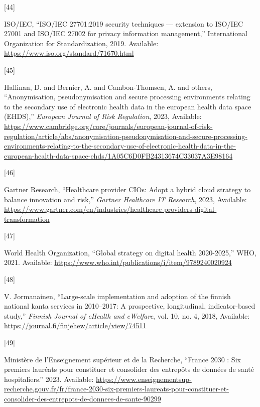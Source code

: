 \documentclass[
  a4paper,
  a4paper,
  11pt]{ltjsbook}
\newlength{\cslhangindent}
\newlength{\csllabelwidth}
\newenvironment{CSLReferences}[2] %
 {\begin{list}{}{%
  \setlength{\itemindent}{0pt}
  \setlength{\leftmargin}{0pt}
  \setlength{\parsep}{0pt}
  \ifodd #1
   \setlength{\leftmargin}{\cslhangindent}
   \setlength{\itemindent}{-1\cslhangindent}
  \fi
  \setlength{\itemsep}{#2\baselineskip}}}
 {\end{list}}
\newcommand{\CSLLeftMargin}[1]{\parbox[t]{\csllabelwidth}{\strut#1\strut}}
\newcommand{\CSLRightInline}[1]{\parbox[t]{\linewidth - \csllabelwidth}{\strut#1\strut}}
\begin{document}
\begin{CSLReferences}{0}{0}
\CSLLeftMargin{{[}44{]} }%
\CSLRightInline{ISO/IEC, {``ISO/IEC 27701:2019 security techniques ---
extension to ISO/IEC 27001 and ISO/IEC 27002 for privacy information
management,''} International Organization for Standardization, 2019.
Available: \url{https://www.iso.org/standard/71670.html}}

\CSLLeftMargin{{[}45{]} }%
\CSLRightInline{Hallinan, D. and Bernier, A. and Cambon-Thomsen, A. and
others, {``Anonymisation, pseudonymisation and secure processing
environments relating to the secondary use of electronic health data in
the european health data space (EHDS),''} \emph{European Journal of Risk
Regulation}, 2023, Available:
\url{https://www.cambridge.org/core/journals/european-journal-of-risk-regulation/article/abs/anonymisation-pseudonymisation-and-secure-processing-environments-relating-to-the-secondary-use-of-electronic-health-data-in-the-european-health-data-space-ehds/1A05C6D0FB24313674C33037A3E98164}}

\CSLLeftMargin{{[}46{]} }%
\CSLRightInline{Gartner Research, {``Healthcare provider CIOs: Adopt a
hybrid cloud strategy to balance innovation and risk,''} \emph{Gartner
Healthcare IT Research}, 2023, Available:
\url{https://www.gartner.com/en/industries/healthcare-providers-digital-transformation}}

\CSLLeftMargin{{[}47{]} }%
\CSLRightInline{World Health Organization, {``Global strategy on digital
health 2020-2025,''} WHO, 2021. Available:
\url{https://www.who.int/publications/i/item/9789240020924}}

\CSLLeftMargin{{[}48{]} }%
\CSLRightInline{V. Jormanainen, {``Large-scale implementation and
adoption of the finnish national kanta services in 2010--2017: A
prospective, longitudinal, indicator-based study,''} \emph{Finnish
Journal of eHealth and eWelfare}, vol. 10, no. 4, 2018, Available:
\url{https://journal.fi/finjehew/article/view/74511}}

\CSLLeftMargin{{[}49{]} }%
\CSLRightInline{Ministère de l'Enseignement supérieur et de la
Recherche, {``France 2030 : Six premiers lauréats pour constituer et
consolider des entrepôts de données de santé hospitaliers.''} 2023.
Available:
\url{https://www.enseignementsup-recherche.gouv.fr/fr/france-2030-six-premiers-laureats-pour-constituer-et-consolider-des-entrepots-de-donnees-de-sante-90299}}


\end{CSLReferences}
\end{document}
